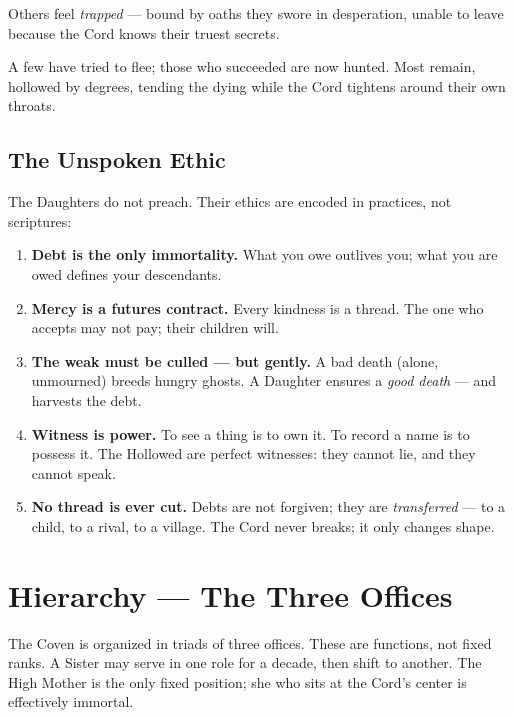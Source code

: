 \documentclass[10pt,twoside]{book}
\begin{document}
Others feel \emph{trapped} --- bound by oaths they swore in desperation, unable to leave because the Cord knows their truest secrets.

A few have tried to flee; those who succeeded are now hunted. Most remain, hollowed by degrees, tending the dying while the Cord tightens around their own throats.

\section{The Unspoken Ethic}

The Daughters do not preach. Their ethics are encoded in practices, not scriptures:

\begin{enumerate}[label=\arabic*.]
\item \textbf{Debt is the only immortality.} What you owe outlives you; what you are owed defines your descendants.
\item \textbf{Mercy is a futures contract.} Every kindness is a thread. The one who accepts may not pay; their children will.
\item \textbf{The weak must be culled --- but gently.} A bad death (alone, unmourned) breeds hungry ghosts. A Daughter ensures a \emph{good death} --- and harvests the debt.
\item \textbf{Witness is power.} To see a thing is to own it. To record a name is to possess it. The Hollowed are perfect witnesses: they cannot lie, and they cannot speak.
\item \textbf{No thread is ever cut.} Debts are not forgiven; they are \emph{transferred} --- to a child, to a rival, to a village. The Cord never breaks; it only changes shape.
\end{enumerate}

\chapter{Hierarchy --- The Three Offices}

The Coven is organized in triads of three offices. These are functions, not fixed ranks. A Sister may serve in one role for a decade, then shift to another. The High Mother is the only fixed position; she who sits at the Cord's center is effectively immortal.
\end{document}
